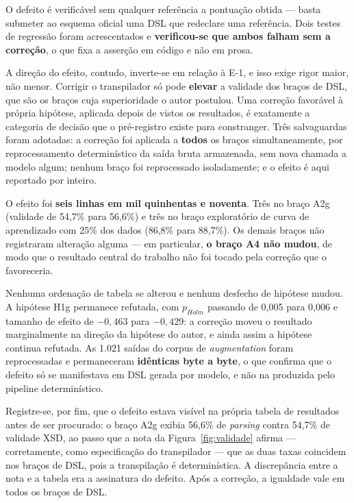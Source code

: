 O defeito é verificável sem qualquer referência a pontuação obtida --- basta submeter ao esquema oficial uma DSL que redeclare uma referência. Dois testes de regressão foram acrescentados e \textbf{verificou-se que ambos falham sem a correção}, o que fixa a asserção em código e não em prosa.

A direção do efeito, contudo, inverte-se em relação à E-1, e isso exige rigor maior, não menor. Corrigir o transpilador só pode \textbf{elevar} a validade dos braços de DSL, que são os braços cuja superioridade o autor postulou. Uma correção favorável à própria hipótese, aplicada depois de vistos os resultados, é exatamente a categoria de decisão que o pré-registro existe para constranger. Três salvaguardas foram adotadas: a correção foi aplicada a \textbf{todos} os braços simultaneamente, por reprocessamento determinístico da saída bruta armazenada, sem nova chamada a modelo algum; nenhum braço foi reprocessado isoladamente; e o efeito é aqui reportado por inteiro.

O efeito foi \textbf{seis linhas em mil quinhentas e noventa}. Três no braço A2g (validade de 54,7\% para 56,6\%) e três no braço exploratório de curva de aprendizado com 25\% dos dados (86,8\% para 88,7\%). Os demais braços não registraram alteração alguma --- em particular, \textbf{o braço A4 não mudou}, de modo que o resultado central do trabalho não foi tocado pela correção que o favoreceria.

Nenhuma ordenação de tabela se alterou e nenhum desfecho de hipótese mudou. A hipótese H1g permanece refutada, com $p_{Holm}$ passando de 0,005 para 0,006 e tamanho de efeito de $-0{,}463$ para $-0{,}429$: a correção moveu o resultado marginalmente na direção da hipótese do autor, e ainda assim a hipótese continua refutada. As 1.021 saídas do corpus de \textit{augmentation} foram reprocessadas e permaneceram \textbf{idênticas byte a byte}, o que confirma que o defeito só se manifestava em DSL gerada por modelo, e não na produzida pelo pipeline determinístico.

Registre-se, por fim, que o defeito estava visível na própria tabela de resultados antes de ser procurado: o braço A2g exibia 56,6\% de \textit{parsing} contra 54,7\% de validade XSD, ao passo que a nota da Figura~\ref{fig:validade} afirma --- corretamente, como especificação do transpilador --- que as duas taxas coincidem nos braços de DSL, pois a transpilação é determinística. A discrepância entre a nota e a tabela era a assinatura do defeito. Após a correção, a igualdade vale em todos os braços de DSL.

